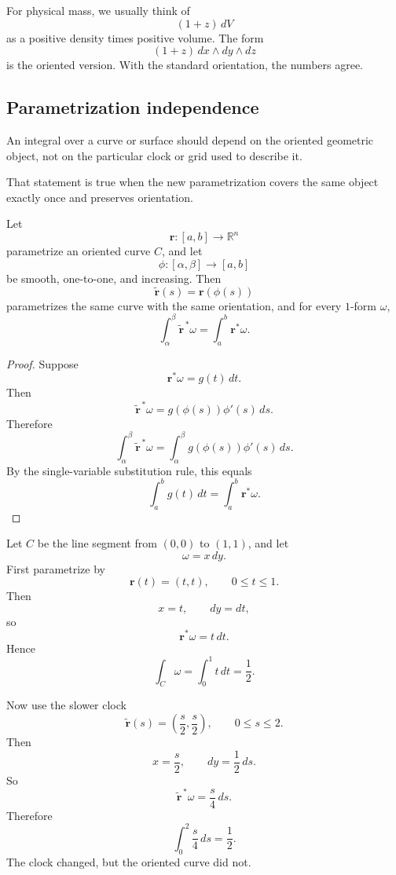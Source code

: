 For physical mass, we usually think of
\[
    (1+z)\,dV
\]
as a positive density times positive volume.  The form
\[
    (1+z)\,dx\wedge dy\wedge dz
\]
is the oriented version.  With the standard orientation, the numbers agree.

\subsection{Parametrization independence}

An integral over a curve or surface should depend on the oriented geometric object,
not on the particular clock or grid used to describe it.

That statement is true when the new parametrization covers the same object exactly
once and preserves orientation.

\begin{theorem}
Let
\[
    \mathbf r:[a,b]\to\mathbb R^n
\]
parametrize an oriented curve \(C\), and let
\[
    \phi:[\alpha,\beta]\to[a,b]
\]
be smooth, one-to-one, and increasing.  Then
\[
    \widetilde{\mathbf r}(s)=\mathbf r(\phi(s))
\]
parametrizes the same curve with the same orientation, and for every \(1\)-form
\(\omega\),
\[
\boxed{
    \int_\alpha^\beta \widetilde{\mathbf r}^{\,*}\omega
    =
    \int_a^b \mathbf r^*\omega.
}
\]
\end{theorem}

\begin{proof}
Suppose
\[
    \mathbf r^*\omega=g(t)\,dt.
\]
Then
\[
    \widetilde{\mathbf r}^{\,*}\omega
    =
    g(\phi(s))\phi'(s)\,ds.
\]
Therefore
\[
    \int_\alpha^\beta \widetilde{\mathbf r}^{\,*}\omega
    =
    \int_\alpha^\beta g(\phi(s))\phi'(s)\,ds.
\]
By the single-variable substitution rule, this equals
\[
    \int_a^b g(t)\,dt
    =
    \int_a^b \mathbf r^*\omega.
\]
\end{proof}

\begin{example}
Let \(C\) be the line segment from \((0,0)\) to \((1,1)\), and let
\[
    \omega=x\,dy.
\]
First parametrize by
\[
    \mathbf r(t)=(t,t),
    \qquad
    0\le t\le1.
\]
Then
\[
    x=t,
    \qquad
    dy=dt,
\]
so
\[
    \mathbf r^*\omega=t\,dt.
\]
Hence
\[
    \int_C\omega=\int_0^1 t\,dt=\frac12.
\]

Now use the slower clock
\[
    \widetilde{\mathbf r}(s)=\left(\frac{s}{2},\frac{s}{2}\right),
    \qquad
    0\le s\le2.
\]
Then
\[
    x=\frac{s}{2},
    \qquad
    dy=\frac12\,ds.
\]
So
\[
    \widetilde{\mathbf r}^{\,*}\omega=\frac{s}{4}\,ds.
\]
Therefore
\[
    \int_0^2 \frac{s}{4}\,ds=\frac12.
\]
The clock changed, but the oriented curve did not.
\end{example}

